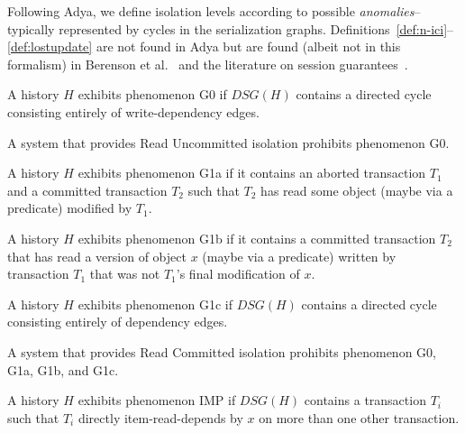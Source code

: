 Following Adya, we define isolation levels according to
possible \textit{anomalies}--typically represented by cycles in the
serialization graphs. Definitions~\ref{def:n-ici}--\ref{def:lostupdate}
are not found in Adya but are found (albeit not in this formalism) in
Berenson et al.~\cite{ansicritique} and the literature on session
guarantees~\cite{sessionguarantees, vogels-defs}.

\begin{definition}
A history $H$ exhibits phenomenon G0 if $DSG(H)$ contains a directed
cycle consisting entirely of write-dependency edges.
\end{definition}

\begin{definition}
A system that provides Read Uncommitted isolation prohibits phenomenon G0.
\end{definition}

\begin{definition}
A history $H$ exhibits phenomenon G1a if it contains an aborted
transaction $T_1$ and a committed transaction $T_2$ such that $T_2$ has read
some object (maybe via a predicate) modiﬁed by $T_1$.
\end{definition}

\begin{definition}
A history $H$ exhibits phenomenon G1b if it contains a committed
transaction $T_2$ that has read a version of object $x$ (maybe via a
predicate) written by transaction $T_1$ that was not $T_1$’s ﬁnal
modiﬁcation of $x$.
\end{definition}

\begin{definition}
A history $H$ exhibits phenomenon G1c if $DSG(H)$ contains a directed
cycle consisting entirely of dependency edges.
\end{definition}

\begin{definition}
A system that provides Read Committed isolation prohibits phenomenon G0, G1a, G1b, and G1c.
\end{definition}

\begin{definition}
\label{def:imp}
A history $H$ exhibits phenomenon IMP if $DSG(H)$ contains a
transaction $T_i$ such that $T_i$ directly item-read-depends by $x$ on more
than one other transaction.
\end{definition}

